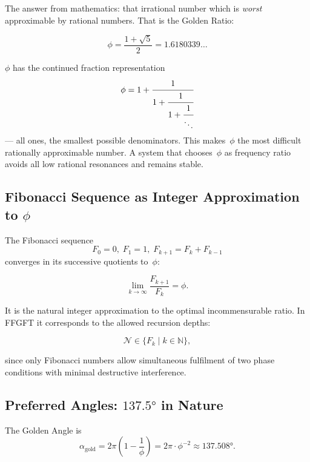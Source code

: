 The answer from mathematics: that irrational number which is
\emph{worst} approximable by rational numbers.
That is the Golden Ratio:

\begin{equation}
  \phi = \frac{1 + \sqrt{5}}{2} = 1.6180339\ldots
\end{equation}

\begin{keybox}
$\phi$ has the continued fraction representation
\[
  \phi = 1 + \cfrac{1}{1 + \cfrac{1}{1 + \cfrac{1}{\ddots}}}
\]
— all ones, the smallest possible denominators. This makes~$\phi$
the most difficult rationally approximable number. A system that
chooses~$\phi$ as frequency ratio avoids all low rational resonances
and remains stable.
\end{keybox}

\subsection{Fibonacci Sequence as Integer Approximation to $\phi$}

The Fibonacci sequence
\begin{equation}
  F_0 = 0,\; F_1 = 1,\; F_{k+1} = F_k + F_{k-1}
\end{equation}
converges in its successive quotients to~$\phi$:

\begin{equation}
  \lim_{k \to \infty} \frac{F_{k+1}}{F_k} = \phi.
\end{equation}

It is the natural integer approximation to the optimal
incommensurable ratio. In FFGFT it corresponds to the allowed
recursion depths:

\begin{equation}
  \mathcal{N} \in \{F_k \mid k \in \mathbb{N}\},
\end{equation}

since only Fibonacci numbers allow simultaneous fulfilment of two
phase conditions with minimal destructive interference.

\subsection{Preferred Angles: $137.5°$ in Nature}

The Golden Angle is
\begin{equation}
  \alpha_{\text{gold}} = 2\pi \left(1 - \frac{1}{\phi}\right)
  = 2\pi \cdot \phi^{-2}
  \approx 137.508°.
\end{equation}

